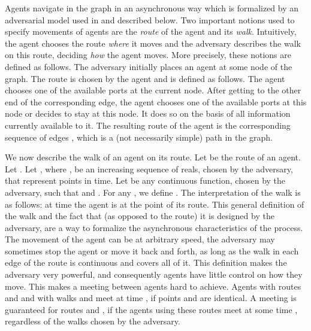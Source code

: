 \documentclass [11pt] {article}
\begin{document}
Agents navigate in the graph in an asynchronous way which is formalized by an adversarial model used in 
\cite{BCGIL,CCGL,CLP,DGKKPV,GP} and described below.
Two important notions used to specify movements of agents are the {\em route} of the agent and its {\em walk}.
Intuitively, the agent chooses the route {\em where} it moves and the adversary describes the walk on this 
route, deciding {\em how} the agent  moves. More precisely,  these notions are defined as follows.
The adversary initially places an agent at some node of the graph.
The route is chosen by the agent and is defined as follows. 
The agent chooses one of the available ports at the current node. 
After getting to the other end of the corresponding edge, the agent chooses one of the available ports at this node
or decides to stay at this node. It does so on the basis of all information currently available to it.
The resulting route of the agent is the corresponding sequence of edges ,
which is a (not necessarily simple) path in the graph. 

We now describe the walk  of an agent on its route. Let  be the route of an agent. Let .
Let , where , be an increasing sequence of reals, chosen by the adversary, 
that represent points in time. Let  be any continuous function, chosen by the adversary, such that  and . For any , we define . 
The interpretation of the walk  is as follows: at time  the agent
is at the point  of its route.  This general definition of the walk and the fact that (as opposed to the route) it is designed by the adversary,
are a way to formalize the asynchronous characteristics of the process.  The movement of the agent can be
at arbitrary speed, the adversary may sometimes stop the agent or move it back and forth, as long as the walk 
in each edge of the route is continuous and covers all of it.
This definition makes the adversary very powerful,
and consequently agents have little control on how they move. This makes a meeting between agents hard to achieve.
Agents with routes  and  and with walks  and  meet at time ,
if points  and  are identical. 
A meeting is guaranteed for routes  and ,
if the agents using these routes meet at some time , regardless of the walks chosen by the adversary.
\end{document}
